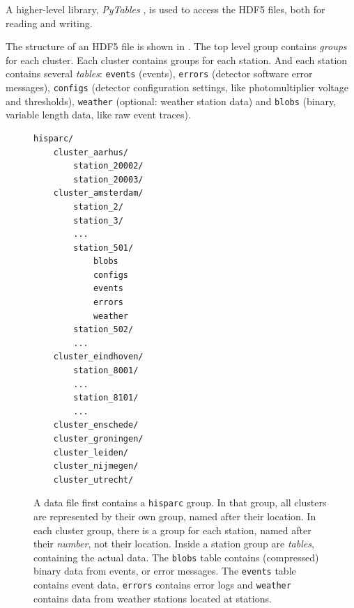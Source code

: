 A higher-level library, \emph{PyTables} \cite{PyTables}, is used to access the
HDF5 files, both for reading and writing.

The structure of an HDF5 file is shown in .
 The top level \hisparc group contains \emph{groups} for each cluster.  Each
cluster contains groups for each station.  And each station contains several
\emph{tables}: \verb|events| (\hisparc events), \verb|errors| (detector software
error messages), \verb|configs| (detector configuration settings, like
photomultiplier voltage and thresholds), \verb|weather| (optional: weather
station data) and \verb|blobs| (binary, variable length data, like raw event
traces).
\begin{figure}
\begin{minipage}{.45\linewidth}
\centering
\begin{minipage}{160pt}
\begin{verbatim}
hisparc/
    cluster_aarhus/
        station_20002/
        station_20003/
    cluster_amsterdam/
        station_2/
        station_3/
        ...
        station_501/
            blobs
            configs
            events
            errors
            weather
        station_502/
        ...
    cluster_eindhoven/
        station_8001/
        ...
        station_8101/
        ...
    cluster_enschede/
    cluster_groningen/
    cluster_leiden/
    cluster_nijmegen/
    cluster_utrecht/
\end{verbatim}
\end{minipage}
\end{minipage}
\caption{  A data file first
contains a \texttt{hisparc} group.  In that group, all clusters are represented
by their own group, named after their location.  In each cluster group, there is
a group for each station, named after their \emph{number}, not their location.
Inside a station group are \emph{tables}, containing the actual data.  The
\texttt{blobs} table contains (compressed) binary data from \hisparc events, or
error messages.  The \texttt{events} table contains event data, \texttt{errors}
contains error logs and \texttt{weather} contains data from weather stations
located at \hisparc stations.}
\label{fig:datastore-file-structure}
\end{figure}

